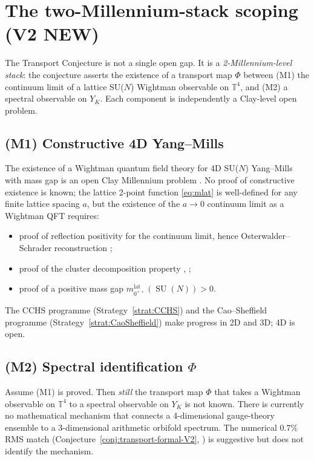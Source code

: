 \documentclass[11pt,a4paper,reqno]{amsart}
\theoremstyle{definition}
\DeclareMathOperator{\SU}{SU}
\newcommand{\YK}{Y_K}
\newcommand{\TT}{\mathbb{T}}
\begin{document}
\section{The two-Millennium-stack scoping (V2 NEW)}\label{sec:two-mill}

The Transport Conjecture is not a single open gap. It is a \emph{2-Millennium-level stack}: the conjecture asserts the existence of a transport map $\Phi$ between (M1) the continuum limit of a lattice SU($N$) Wightman observable on $\TT^4$, and (M2) a spectral observable on $\YK$. Each component is independently a Clay-level open problem.

\subsection{(M1) Constructive 4D Yang--Mills}\label{ss:M1}

The existence of a Wightman quantum field theory for 4D SU($N$) Yang--Mills with mass gap is an open Clay Millennium problem \cite{JaffeWitten2000}. No proof of constructive existence is known; the lattice 2-point function \eqref{eq:mlat} is well-defined for any finite lattice spacing $a$, but the existence of the $a\to 0$ continuum limit as a Wightman QFT requires:
\begin{itemize}[leftmargin=2em]
  \item proof of reflection positivity for the continuum limit, hence Osterwalder--Schrader reconstruction \cite{StreaterWightman1964};
  \item proof of the cluster decomposition property \cite{Wightman1956}, \cite{HaagKastler1964};
  \item proof of a positive mass gap $m_{0^{++}}^{\mathrm{lat}}(\SU(N)) > 0$.
\end{itemize}
The CCHS programme (Strategy~\ref{strat:CCHS}) and the Cao--Sheffield programme (Strategy~\ref{strat:CaoSheffield}) make progress in 2D and 3D; 4D is open.

\subsection{(M2) Spectral identification $\Phi$}\label{ss:M2}

Assume (M1) is proved. Then \emph{still} the transport map $\Phi$ that takes a Wightman observable on $\TT^4$ to a spectral observable on $\YK$ is not known. There is currently no mathematical mechanism that connects a 4-dimensional gauge-theory ensemble to a 3-dimensional arithmetic orbifold spectrum. The numerical $0.7\%$ RMS match (Conjecture~\ref{conj:transport-formal-V2}, \cite{Remondiere2026RouteB}) is suggestive but does not identify the mechanism.
\end{document}
